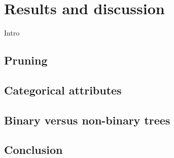\chapter{Results and discussion}\label{cha:results}
Intro

\section{Pruning}


\section{Categorical attributes}

\section{Binary versus non-binary trees}

\section{Conclusion}
